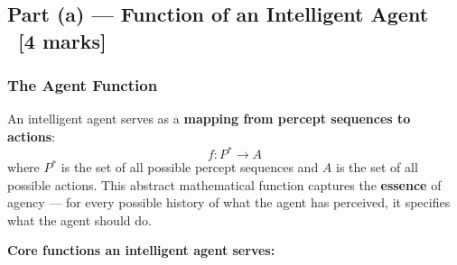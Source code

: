 \documentclass[12pt, a4paper]{article}
\begin{document}
\subsection{Part (a) — Function of an Intelligent Agent \ [4 marks]}

\subsubsection*{The Agent Function}

\noindent An intelligent agent serves as a \textbf{mapping from percept sequences to actions}:
\[
f : P^* \to A
\]
where $P^*$ is the set of all possible percept sequences and $A$ is the set of all possible actions. This abstract mathematical function captures the \textbf{essence} of agency — for every possible history of what the agent has perceived, it specifies what the agent should do.

\vspace{0.4em}
\noindent\textbf{Core functions an intelligent agent serves:}
\end{document}
